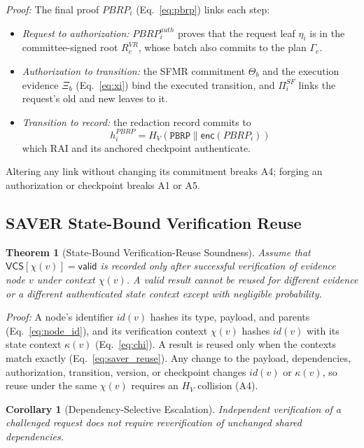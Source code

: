 \documentclass[lettersize,journal]{IEEEtran}
\newtheorem{theorem}{Theorem}
\newtheorem{corollary}{Corollary}
\begin{document}
\emph{Proof:} The final proof $PBRP_i$ (Eq.~\eqref{eq:pbrp}) links each
step:
\begin{itemize}[leftmargin=*,nosep]
\item \emph{Request to authorization:} $PBRP_i^{auth}$ proves that the
request leaf $\eta_i$ is in the committee-signed root $R_e^{VR}$, whose
batch also commits to the plan $\Gamma_e$.
\item \emph{Authorization to transition:} the SFMR commitment $\Theta_b$
and the execution evidence $\Xi_b$ (Eq.~\eqref{eq:xi}) bind the executed
transition, and $\Pi_i^{SF}$ links the request's old and new leaves to
it.
\item \emph{Transition to record:} the redaction record commits to
\begin{equation}
h_i^{PBRP}=H_V(\texttt{PBRP}\parallel\mathsf{enc}(PBRP_i))
\end{equation}
which RAI and its anchored checkpoint authenticate.
\end{itemize}
Altering any link without changing its commitment breaks A4; forging an
authorization or checkpoint breaks A1 or A5.

\subsection{SAVER State-Bound Verification Reuse}

\begin{theorem}[State-Bound Verification-Reuse Soundness]
Assume that $\mathsf{VCS}[\chi(v)]=\mathsf{valid}$ is recorded only
after successful verification of evidence node $v$ under context
$\chi(v)$. A valid result cannot be reused for different evidence or a
different authenticated state context except with negligible
probability.
\end{theorem}

\emph{Proof:} A node's identifier $id(v)$ hashes its type, payload, and
parents (Eq.~\eqref{eq:node_id}), and its verification context
$\chi(v)$ hashes $id(v)$ with its state context $\kappa(v)$
(Eq.~\eqref{eq:chi}). A result is reused only when the contexts match
exactly (Eq.~\eqref{eq:saver_reuse}). Any change to the payload,
dependencies, authorization, transition, version, or checkpoint changes
$id(v)$ or $\kappa(v)$, so reuse under the same $\chi(v)$ requires an
$H_V$ collision (A4).

\begin{corollary}[Dependency-Selective Escalation]
Independent verification of a challenged request does not require
reverification of unchanged shared dependencies.
\end{corollary}
\end{document}
